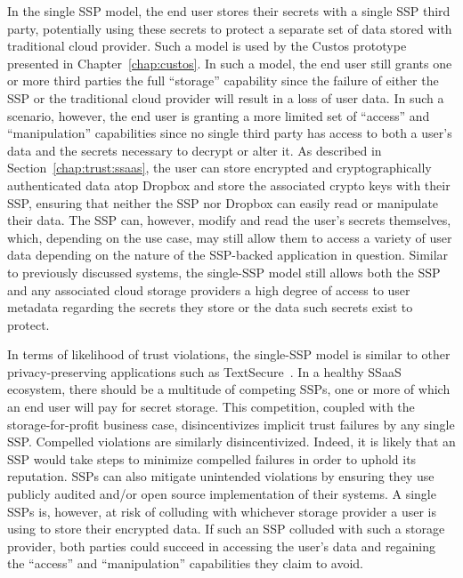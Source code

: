 In the single SSP model, the end user stores their secrets with a
single SSP third party, potentially using these secrets to protect a
separate set of data stored with traditional cloud provider. Such a
model is used by the Custos prototype presented in
Chapter~\ref{chap:custos}. In such a model, the end user still grants
one or more third parties the full ``storage'' capability since the
failure of either the SSP or the traditional cloud provider will
result in a loss of user data. In such a scenario, however, the end
user is granting a more limited set of ``access'' and ``manipulation''
capabilities since no single third party has access to both a user's
data and the secrets necessary to decrypt or alter it. As
described in Section~\ref{chap:trust:ssaas}, the user can store
encrypted and cryptographically authenticated data atop Dropbox and
store the associated crypto keys with their SSP, ensuring that neither
the SSP nor Dropbox can easily read or manipulate their data. The SSP
can, however, modify and read the user's secrets themselves, which,
depending on the use case, may still allow them to access a variety of
user data depending on the nature of the SSP-backed application in
question. Similar to previously discussed systems, the single-SSP
model still allows both the SSP and any associated cloud storage
providers a high degree of access to user metadata regarding the
secrets they store or the data such secrets exist to protect.

In terms of likelihood of trust violations, the single-SSP model is
similar to other privacy-preserving applications such as
TextSecure~\cite{frosch2014}. In a healthy SSaaS ecosystem, there
should be a multitude of competing SSPs, one or more of which an end
user will pay for secret storage. This competition, coupled with the
storage-for-profit business case, disincentivizes implicit trust
failures by any single SSP. Compelled violations are similarly
disincentivized. Indeed, it is likely that an SSP would take steps to
minimize compelled failures in order to uphold its reputation. SSPs
can also mitigate unintended violations by ensuring they use publicly
audited and/or open source implementation of their systems. A single
SSPs is, however, at risk of colluding with whichever storage provider
a user is using to store their encrypted data. If such an SSP colluded
with such a storage provider, both parties could succeed in accessing
the user's data and regaining the ``access'' and ``manipulation''
capabilities they claim to avoid.

